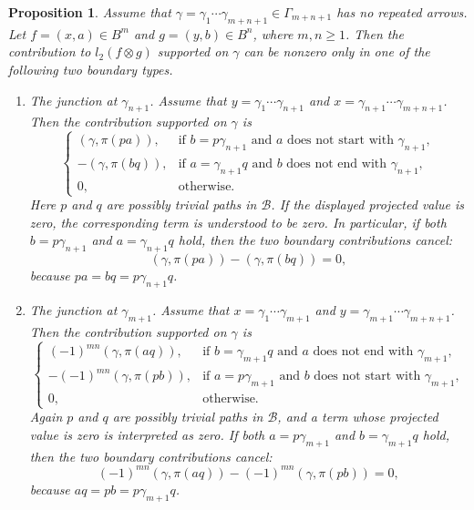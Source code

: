 \documentclass[11pt,a4paper,reqno]{amsart}
\newcommand{\mB}{\mathcal B}
\newcommand{\para}[2]{(#1,#2)}
\theoremstyle{plain}
\newtheorem{proposition}[proposition]{Proposition}
\theoremstyle{definition}
\numberwithin{equation}{section}
\begin{document}
	\begin{proposition}\label{NRA-read-off}
		Assume that
		$\gamma=\gamma_1\cdots\gamma_{m+n+1}\in\Gamma_{m+n+1}$ has no repeated arrows.
		Let $f=\para{x}{a}\in B^m$ and $g=\para{y}{b}\in B^n$, where $m,n\geq1$.
		Then the contribution to $l_2(f\otimes g)$ supported on $\gamma$ can be
		nonzero only in one of the following two boundary types.
		\begin{enumerate}
			\item[Type 1:] The junction at $\gamma_{n+1}$.
			Assume that
			$y=\gamma_1\cdots\gamma_{n+1}$ and
			$x=\gamma_{n+1}\cdots\gamma_{m+n+1}$.
			Then the contribution supported on $\gamma$ is
			\[
			\begin{cases}
				\para{\gamma}{\pi(pa)},
				&\text{if }
				b=p\gamma_{n+1}
				\text{ and } a \text{ does not start with } \gamma_{n+1},
				\\
				-\para{\gamma}{\pi(bq)},
				&\text{if }
				a=\gamma_{n+1}q
				\text{ and } b \text{ does not end with } \gamma_{n+1},
				\\
				0,
				&
				\text{otherwise.}
			\end{cases}
			\]
			Here $p$ and $q$ are possibly trivial paths in $\mB$.  If the displayed projected value is zero, the corresponding term is understood to be zero.  In
			particular, if both
			$b=p\gamma_{n+1}$ and $a=\gamma_{n+1}q$
			hold, then the two boundary contributions cancel:
			\[
			\para{\gamma}{\pi(pa)}
			-
			\para{\gamma}{\pi(bq)}
			=
			0,
			\]
			because $pa=bq=p\gamma_{n+1}q$.
			\item[Type 2:] The junction at $\gamma_{m+1}$.
			Assume that
			$x=\gamma_1\cdots\gamma_{m+1}$ and
			$y=\gamma_{m+1}\cdots\gamma_{m+n+1}$.
			Then the contribution supported on $\gamma$ is
			\[
			\begin{cases}
				(-1)^{mn}\para{\gamma}{\pi(aq)},
				&\text{if }
				b=\gamma_{m+1}q
				\text{ and } a \text{ does not end with } \gamma_{m+1},
				\\
				-(-1)^{mn}\para{\gamma}{\pi(pb)},
				&\text{if }
				a=p\gamma_{m+1}
				\text{ and } b \text{ does not start with } \gamma_{m+1},
				\\
				0,
				&
				\text{otherwise.}
			\end{cases}
			\]
			Again $p$ and $q$ are possibly trivial paths in $\mB$, and a term whose projected value is zero is interpreted as zero.  If both
			$a=p\gamma_{m+1}$ and $b=\gamma_{m+1}q$
			hold, then the two boundary contributions cancel:
			\[
			(-1)^{mn}\para{\gamma}{\pi(aq)}
			-
			(-1)^{mn}\para{\gamma}{\pi(pb)}
			=
			0,
			\]
			because $aq=pb=p\gamma_{m+1}q$.
		\end{enumerate}
	\end{proposition}
\end{document}
